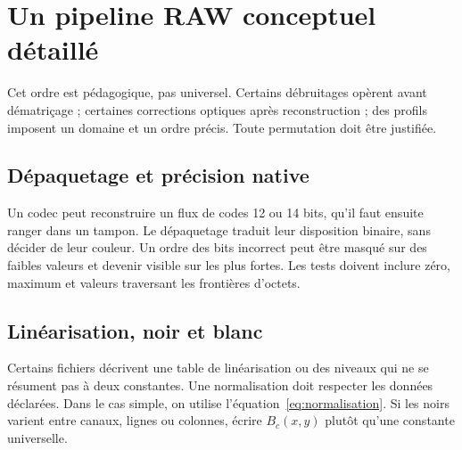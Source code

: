 \section{Un pipeline RAW conceptuel détaillé}
\begin{center}
\end{center}
Cet ordre est pédagogique, pas universel. Certains débruitages
opèrent avant dématriçage ; certaines corrections optiques
après reconstruction ; des profils imposent un domaine
et un ordre précis. Toute permutation doit être justifiée.

\subsection{Dépaquetage et précision native}
Un codec peut reconstruire un flux de codes 12 ou 14 bits,
qu'il faut ensuite ranger dans un tampon. Le dépaquetage
traduit leur disposition binaire, sans décider de leur couleur.
Un ordre des bits incorrect peut être masqué sur des faibles
valeurs et devenir visible sur les plus fortes. Les tests
doivent inclure zéro, maximum et valeurs traversant les
frontières d'octets.

\subsection{Linéarisation, noir et blanc}
Certains fichiers décrivent une table de linéarisation ou
des niveaux qui ne se résument pas à deux constantes. Une
normalisation doit respecter les données déclarées. Dans
le cas simple, on utilise l'équation~\eqref{eq:normalisation}.
Si les noirs varient entre canaux, lignes ou colonnes,
écrire $B_c(x,y)$ plutôt qu'une constante universelle.

